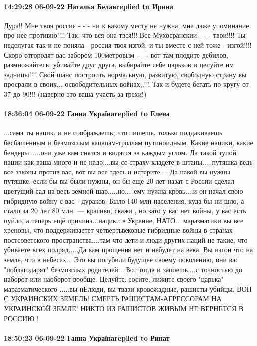\paragraph{14:29:28 06-09-22 Наталья Белаяreplied to Ирина}

Дура!! Мне твоя россия - - - ни к какому месту не нужна, мне даже упоминание
про неё противно!!!! Так, что вся она твоя!!! Все Мухосранскии - - - твои!!!!
Ты недолугая так и не поняла---россия твоя изгой, и ты вместе с ней тоже -
изгой!!!! Скоро отгородят вас забором 100метровым - - - вот там плодите
дебилов, размножайтесь, убивайте друг друга, выбирайте себе царьков и целуйте
им задницы!!!! Свой шанс построить нормальную, развитую, свободную страну вы
просрали в своих,,, освободительных войнах,,!!! Так и будете бегать по кругу от
37 до 90!!! (наверно это ваша участь за грехи!)

\paragraph{18:36:04 06-09-22 Ганна Українаreplied to Елена}

...сама ты нацик, и не соображаешь, что пишешь, только поддакиваешь бесбашенным
и безмозглым кацапам-троллям путиноидным. Какие нацики, какие бендеры......они
уже вам снятся и видятся за каждым углом. Да такой тупой нации как ваша много и
не надо....вы со страху кладете в штаны.....путяшка ведь все законы против вас,
вот вы все здесь и истерите.....Да накой вы нужны путяшке, если бы вы были
нужны, он бы ещё 20 лет назат с России сделал цветущий сад на весь земной
шар.....но.....ему нужна кровь....и он начал свою гибридную войну с вас -
дураков. Было 140 млн населения, куда бы ни шло, а стало за 20 лет 80 млн. ---
красиво, скажи , но зато у вас нет войны, у вас есть пуйло, а теперь ещё
причина...нацики в Украине, НАТО....маразматики вы все хреновы, что
поддерживаетет четвертьвековые гибридные войны в странах постсоветского
пространства....там что дети и люди других наций не такие, что убиваете всех
подряд.....Да вам прощения нет и небудет на века. Вы изгои что на земле, что в
небесах....Это вы погубили будущее своему поколению, они вас "поблагодарят"
безмозглых родителей....Вот тогда и запоешь....с точностью до наборот или
наоборот вообще. Целуйте, сосите, лижите своего "царька" маразматического
.....вы нЕлюди, вы твари кровожадные, рашисты-убийцы. ВОН С УКРАИНСКИХ ЗЕМЕЛЬ!
СМЕРТЬ РАШИСТАМ-АГРЕССОРАМ НА УКРАИНСКОЙ ЗЕМЛЕ! НИКТО ИЗ РАШИСТОВ ЖИВЫМ НЕ
ВЕРНЕТСЯ В РОССИЮ !

\paragraph{18:50:23 06-09-22 Ганна Українаreplied to Ринат}

